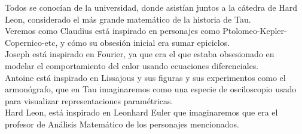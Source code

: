 \documentclass[preview]{standalone}
\begin{document}
\begin{center}
Todos se conocían de la universidad, donde asistían juntos a la cátedra de Hard Leon, considerado el más grande matemático de la historia de Tau.
$$ $$ 
Veremos como Claudius está inspirado en personajes como Ptolomeo-Kepler-Copernico-etc, y cómo su obsesión inicial era sumar epiciclos.  
$$ $$ 
Joseph está inspirado en Fourier, ya que era el que estaba obsesionado en modelar el comportamiento del calor usando ecuaciones diferenciales.  
$$ $$ 
Antoine está inspirado en Lissajous y sus figuras y sus experimentos como el armonógrafo, que en Tau imaginaremos como una especie de osciloscopio usado para visualizar representaciones paramétricas.
$$ $$ 
Hard Leon, está inspirado en Leonhard Euler que imaginaremos que era el profesor de Análisis Matemático de los personajes mencionados.

$$ $$
\end{center}
\end{document}
